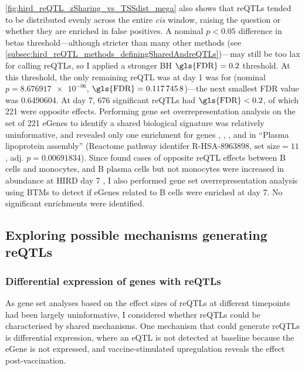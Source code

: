 \cref{fig:hird_reQTL_zSharing_vs_TSSdist_mega} also shows that \glspl{reQTL} tended to be distributed evenly across the entire \textit{cis} window,
raising the question or whether they are enriched in false positives.
A nominal $p < 0.05$ difference in betas threshold---although stricter than many other methods (see \cref{subsec:hird_reQTL_methods_definingSharedAndreQTLs})---may still be too lax for calling \glspl{reQTL},
so I applied a stronger \gls{BH} $\text{\gls{FDR}} = 0.2$ threshold.
At this threshold, the only remaining \gls{reQTL} was at day 1 was for  (nominal $p = \num{8.676917e-06}$, $\text{\gls{FDR}} = \num{0.1177458}$)---the next smallest \gls{FDR} value was \num{0.6490604}.
At day 7, 676 significant \glspl{reQTL} had $\text{\gls{FDR}} < 0.2$, of which 221 were opposite effects.
Performing gene set overrepresentation analysis on the set of 221 eGenes to identify a shared biological signature was relatively uninformative, 
and revealed only one enrichment for genes , , , and  in \enquote{Plasma lipoprotein assembly} (Reactome pathway identifer R-HSA-8963898, $\text{set size} = 11$, adj. $p = \num{0.00691834}$).
Since \textcite{fairfax2012GeneticsGeneExpression} found cases of opposite \gls{reQTL} effects between B cells and monocytes, and B plasma cells but not monocytes were increased in abundance at \gls{HIRD} day 7 \autocite{sobolev2016AdjuvantedInfluenzaH1N1Vaccination},
I also performed gene set overrepresentation analysis using \glspl{BTM} to detect if eGenes related to B cells were enriched at day 7.
No significant enrichments were identified.

\subsection{Exploring possible mechanisms generating reQTLs}

\subsubsection{Differential expression of genes with reQTLs}

As gene set analyses based on the effect sizes of \glspl{reQTL} at different timepoints had been largely uninformative,
I considered whether \glspl{reQTL} could be characterised by shared mechanisms.
One mechanism that could generate \glspl{reQTL} is differential expression, where an \gls{eQTL} is not detected at baseline because the eGene is not expressed, and vaccine-stimulated upregulation reveals the effect post-vaccination.

